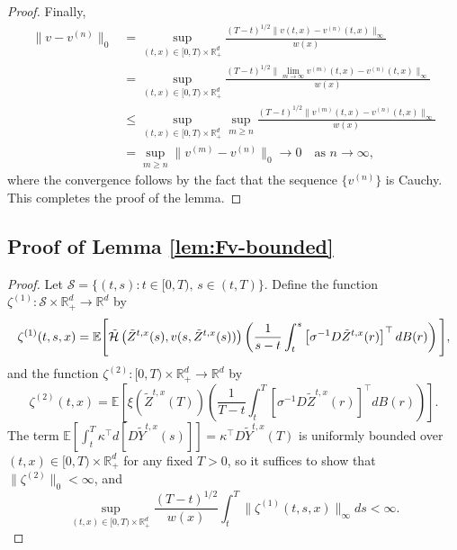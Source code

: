\documentclass[11pt]{article}
\theoremstyle{definition}
\theoremstyle{plain}
\newcommand{\R}{\mathbb{R}}
\newcommand{\E}{\mathbb{E}}
\newcommand{\cH}{{\cal H}}
\begin{document}
\begin{appendices}
\begin{proof}
Finally, 
\begin{align*}
\|v - v^{(n)}\|_0
& = \sup_{(t,x) \in [0,T) \times \mathbb{R}^d_+} \frac{(T - t)^{1/2}\|v(t,x) - v^{(n)}(t,x)\|_\infty}{w(x)} \\
& = \sup_{(t,x) \in [0,T) \times \mathbb{R}^d_+} \frac{(T - t)^{1/2} \|\lim_{m \to \infty} v^{(m)}(t,x) - v^{(n)}(t,x)\|_\infty}{w(x)} \\
& \leq \sup_{(t,x) \in [0,T) \times \mathbb{R}^d_+} \sup_{m \geq n} \frac{(T - t)^{1/2}\|v^{(m)}(t,x) - v^{(n)}(t,x)\|_\infty}{w(x)} \\
& = \sup_{m \geq n} \|v^{(m)} - v^{(n)}\|_0 \to 0 \quad \text{as } n \to \infty,
\end{align*}
where the convergence follows by the fact that the sequence \( \{v^{(n)}\} \) is Cauchy. 
This completes the proof of the lemma.
\end{proof}

\subsection{Proof of Lemma \ref{lem:Fv-bounded}}
\begin{proof} 
Let \( \mathcal{S} = \{ (t,s) : t \in [0,T), \, s \in (t,T) \} \).  
Define the function \( \zeta^{(1)} : \mathcal{S} \times \mathbb{R}^d_+ \to \mathbb{R}^d \) by  
\begin{equation}\label{eq:zeta1}
\zeta^{(1)}(t,s,x) = \mathbb{E} \Bigg[ \tilde \cH \left(\tilde{Z}^{t,x}(s), v(s, \tilde{Z}^{t,x}(s))\right)
\left( \frac{1}{s - t} \int_t^s \left[\sigma^{-1} D\tilde Z^{t,x}(r)\right]^{\top} dB(r) \right) \Bigg],
\end{equation}
and the function \( \zeta^{(2)} : [0,T) \times \mathbb{R}^d_+ \to \mathbb{R}^d \) by  
\begin{equation}\label{eq:zeta2}
\zeta^{(2)}(t,x) = \mathbb{E} \left[ \xi(\tilde{Z}^{t,x}(T)) 
\left( \frac{1}{T - t} \int_t^T \left[\sigma^{-1} D\tilde Z^{t,x}(r)\right]^{\top} dB(r) \right) \right].
\end{equation}
The term $\E\left[\int_t^T \kappa^{\top} d\left[D\tilde Y^{t,x}(s)\right]\right] = \kappa^{\top} D\tilde Y^{t,x}(T)$ is uniformly bounded over $(t,x) \in [0,T)\times \R_+^d$ for any fixed $T >0$, 
so it suffices to show that \( \|\zeta^{(2)}\|_0 < \infty \), and
\[
\sup_{(t,x) \in [0,T) \times \mathbb{R}_+^d} \frac{(T - t)^{1/2}}{w(x)} \int_t^T \|\zeta^{(1)}(t,s,x)\|_\infty ds < \infty.
\] 


\end{proof}
\end{appendices}
\end{document}
